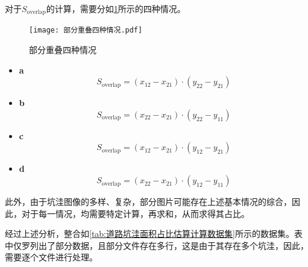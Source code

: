 \documentclass{MathorCupmodeling}
\begin{document}
\begin{itemize}
		对于$S_{\text{overlap}}$的计算，需要分如\textcolor{blue}{\cref{fig:部分重叠四种情况}}所示的四种情况。
		\begin{figure}[H]
			\centering
			\texttt{[image: 部分重叠四种情况.pdf]}
			\caption{部分重叠四种情况}
			\label{fig:部分重叠四种情况}
		\end{figure}
		\begin{itemize}
			\item \textbf{a}
			\begin{equation}
				S_{\text{overlap}}=\left(x_{12}-x_{21}\right)\cdot\left(y_{22}-y_{21}\right)
			\end{equation}
			\item \textbf{b}
			\begin{equation}
				S_{\text{overlap}}=\left(x_{22}-x_{21}\right)\cdot\left(y_{22}-y_{11}\right)
			\end{equation}
			\item \textbf{c}
			\begin{equation}
				S_{\text{overlap}}=\left(x_{12}-x_{21}\right)\cdot\left(y_{12}-y_{21}\right)
			\end{equation}
			\item \textbf{d}
			\begin{equation}
				S_{\text{overlap}}=\left(x_{22}-x_{21}\right)\cdot\left(y_{12}-y_{11}\right)
			\end{equation}
		\end{itemize}
	\end{itemize}

	此外，由于坑洼图像的多样、复杂，部分图片可能存在上述基本情况的综合，因此，对于每一情况，均需要特定计算，再求和，从而求得其占比。
	
	经过上述分析，整合如\textcolor{blue}{\cref{tab:道路坑洼面积占比估算计算数据集}}所示的数据集。表中仅罗列出了部分数据，且部分文件存在多行，这是由于其存在多个坑洼，因此，需要逐个文件进行处理。
\end{document}
